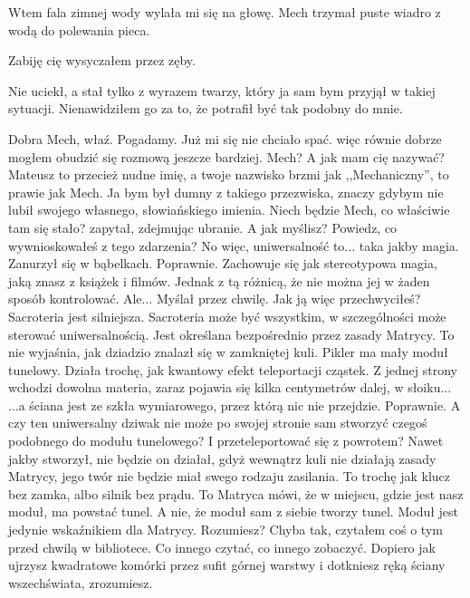 Wtem fala zimnej wody wylała mi się na głowę. 
Mech trzymał puste wiadro z wodą do polewania pieca.
\begin{dialogue}
\ds{} Zabiję cię \dm{} wysyczałem przez zęby.
\end{dialogue}
Nie uciekł, a stał tylko z wyrazem twarzy, który ja sam bym przyjął w takiej sytuacji.
Nienawidziłem go za to, że potrafił być tak podobny do mnie.
\begin{dialogue}
\ds{} Dobra Mech, właź. Pogadamy. \dm{} Już mi się nie chciało spać. więc równie dobrze mogłem obudzić się rozmową jeszcze bardziej.
\ds{} Mech?
\ds{} A jak mam cię nazywać? Mateusz to przecież nudne imię, a twoje nazwisko brzmi jak ,,Mechaniczny'', to prawie jak Mech. 
Ja bym był dumny z takiego przezwiska, znaczy gdybym nie lubił swojego własnego, słowiańskiego imienia.
\ds{} Niech będzie Mech, co właściwie tam się stało? \dm{} zapytał, zdejmując ubranie.
\ds{} A jak myślisz? Powiedz, co wywnioskowałeś z tego zdarzenia?
\ds{} No więc, uniwersalność to... taka jakby magia. \dm{} Zanurzył się w bąbelkach.
\ds{} Poprawnie. Zachowuje się jak stereotypowa magia, jaką znasz z książek i filmów. Jednak z tą różnicą, że nie można jej w żaden sposób kontrolować.
\ds{} Ale... \dm{} Myślał przez chwilę. \dm{} Jak ją więc przechwyciłeś?
\ds{} Sacroteria jest silniejsza. Sacroteria może być wszystkim, w szczególności może sterować uniwersalnością. Jest określana bezpośrednio przez zasady Matrycy.
\ds{} To nie wyjaśnia, jak dziadzio znalazł się w zamkniętej kuli.
\ds{} Pikler ma mały moduł tunelowy. Działa trochę, jak kwantowy efekt teleportacji cząstek. Z jednej strony wchodzi dowolna materia, zaraz pojawia się kilka centymetrów dalej, w słoiku...
\ds{} ...a ściana jest ze szkła wymiarowego, przez którą nic nie przejdzie.
\ds{} Poprawnie.
\ds{} A czy ten uniwersalny dziwak nie może po swojej stronie sam stworzyć czegoś podobnego do modułu tunelowego? I przeteleportować się z powrotem?
\ds{} Nawet jakby stworzył, nie będzie on działał, gdyż wewnątrz kuli nie działają zasady Matrycy, jego twór nie będzie miał swego rodzaju zasilania.
To trochę jak klucz bez zamka, albo silnik bez prądu. 
To Matryca mówi, że w miejscu, gdzie jest nasz moduł, ma powstać tunel. A nie, że moduł sam z siebie tworzy tunel. Moduł jest jedynie wskaźnikiem dla Matrycy. Rozumiesz?
\ds{} Chyba tak, czytałem coś o tym przed chwilą w bibliotece.
\ds{} Co innego czytać, co innego zobaczyć. Dopiero jak ujrzysz kwadratowe komórki przez sufit górnej warstwy i dotkniesz ręką ściany wszechświata, zrozumiesz.
\end{dialogue}

